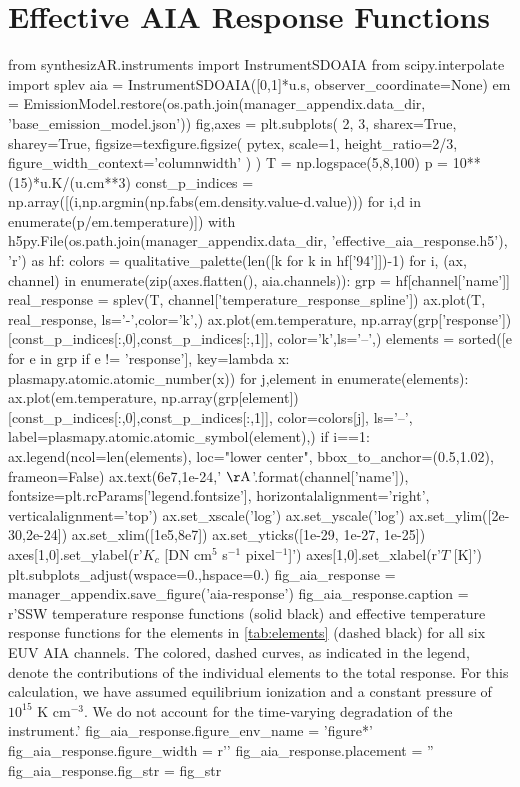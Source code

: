 \section{Effective AIA Response Functions}\label{effective_response_functions}

\begin{pycode}
from synthesizAR.instruments import InstrumentSDOAIA
from scipy.interpolate import splev
aia = InstrumentSDOAIA([0,1]*u.s, observer_coordinate=None)
em = EmissionModel.restore(os.path.join(manager_appendix.data_dir, 'base_emission_model.json'))
fig,axes = plt.subplots(
    2, 3, sharex=True, sharey=True,
    figsize=texfigure.figsize(
        pytex, 
        scale=1,
        height_ratio=2/3,       
        figure_width_context='columnwidth'
    )
)
T = np.logspace(5,8,100)
p = 10**(15)*u.K/(u.cm**3)
const_p_indices = np.array([(i,np.argmin(np.fabs(em.density.value-d.value))) 
                            for i,d in enumerate(p/em.temperature)])
with h5py.File(os.path.join(manager_appendix.data_dir, 'effective_aia_response.h5'), 'r') as hf:
    colors = qualitative_palette(len([k for k in hf['94']])-1)
    for i, (ax, channel) in enumerate(zip(axes.flatten(), aia.channels)):
        grp = hf[channel['name']]
        real_response = splev(T, channel['temperature_response_spline'])
        ax.plot(T, real_response, ls='-',color='k',)
        ax.plot(em.temperature, 
                np.array(grp['response'])[const_p_indices[:,0],const_p_indices[:,1]],
                color='k',ls='--',)
        elements = sorted([e for e in grp if e != 'response'],
                            key=lambda x: plasmapy.atomic.atomic_number(x))
        for j,element in enumerate(elements):
            ax.plot(em.temperature, 
                    np.array(grp[element])[const_p_indices[:,0],const_p_indices[:,1]],
                    color=colors[j], ls='--', label=plasmapy.atomic.atomic_symbol(element),)
        if i==1:
            ax.legend(ncol=len(elements), loc="lower center", bbox_to_anchor=(0.5,1.02),
                        frameon=False)
        ax.text(6e7,1e-24,'{} $\mathrm{{\AA}}$'.format(channel['name']),
                fontsize=plt.rcParams['legend.fontsize'],
                horizontalalignment='right', verticalalignment='top')
ax.set_xscale('log')
ax.set_yscale('log')
ax.set_ylim([2e-30,2e-24])
ax.set_xlim([1e5,8e7])
ax.set_yticks([1e-29, 1e-27, 1e-25])
axes[1,0].set_ylabel(r'$K_c$ [DN cm$^5$ s$^{-1}$ pixel$^{-1}$]')
axes[1,0].set_xlabel(r'$T$ [K]')
plt.subplots_adjust(wspace=0.,hspace=0.)
fig_aia_response = manager_appendix.save_figure('aia-response')
fig_aia_response.caption = r'SSW temperature response functions (solid black) and effective temperature response functions for the elements in \autoref{tab:elements} (dashed black) for all six EUV AIA channels. The colored, dashed curves, as indicated in the legend, denote the contributions of the individual elements to the total response. For this calculation, we have assumed equilibrium ionization and a constant pressure of $10^{15}$ K cm$^{-3}$. We do not account for the time-varying degradation of the instrument.'
fig_aia_response.figure_env_name = 'figure*'
fig_aia_response.figure_width = r'\columnwidth'
fig_aia_response.placement = ''
fig_aia_response.fig_str = fig_str
\end{pycode}
